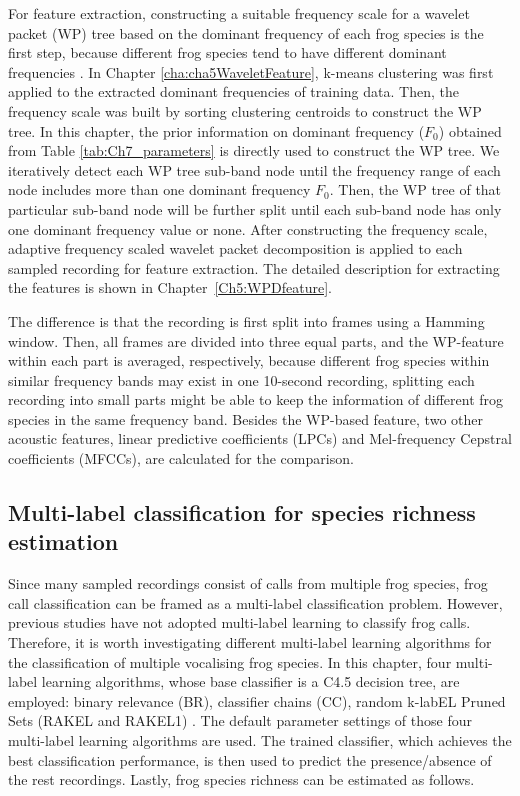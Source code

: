 For feature extraction, constructing a suitable frequency scale for a wavelet packet (WP) tree based on the dominant frequency of each frog species is the first step, because different frog species tend to have different dominant frequencies \citep{Gingras2013}. In Chapter \ref{cha:cha5WaveletFeature}, k-means clustering was first applied to the extracted dominant frequencies of training data. Then, the frequency scale was built by sorting clustering centroids to construct the WP tree. In this chapter, the prior information on dominant frequency  ($F_{0}$) obtained from Table \ref{tab:Ch7_parameters} is directly used to construct the WP tree. We iteratively detect each WP tree sub-band node until the frequency range of each node includes more than one dominant frequency $F_{0}$. Then, the WP tree of that particular sub-band node will be further split until each sub-band node has only one dominant frequency value or none. After constructing the frequency scale, adaptive frequency scaled wavelet packet decomposition is applied to each sampled recording for feature extraction. The detailed description for extracting the features is shown in Chapter~\ref{Ch5:WPDfeature}.



The difference is that the recording is first split into frames using a Hamming window. Then, all frames are divided into three equal parts, and the WP-feature within each part is averaged, respectively, because different frog species within similar frequency bands may exist in one 10-second recording, splitting each recording into small parts might be able to keep the information of different frog species in the same frequency band. Besides the WP-based feature, two other acoustic features, linear predictive coefficients (LPCs) and Mel-frequency Cepstral coefficients (MFCCs), are calculated for the comparison.




\subsection{Multi-label classification for species richness estimation} 
Since many sampled recordings consist of calls from multiple frog species, frog call classification can be framed as a multi-label classification problem. However, previous studies have not adopted multi-label learning to classify frog calls. Therefore, it is worth investigating different multi-label learning algorithms for the classification of multiple vocalising frog species. In this chapter, four multi-label learning algorithms, whose base classifier is a C4.5 decision tree, are employed: binary relevance (BR), classifier chains (CC), random k-labEL Pruned Sets (RAKEL and RAKEL1) \citep{ZhangReview2014}. The default parameter settings of those four multi-label learning algorithms are used. The trained classifier, which achieves the best classification performance, is then used to predict the presence/absence of the rest recordings. Lastly, frog species richness can be estimated as follows.

